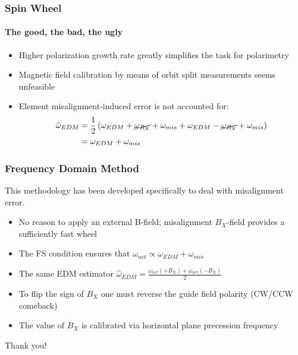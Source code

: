 \documentclass{beamer}
\newcommand{\w}{\omega}
\begin{document}
\begin{frame}\frametitle{Spin Wheel}\framesubtitle{The good, the bad, the ugly}
  \begin{itemize}
  \item Higher polarization growth rate greatly simplifies the task for polarimetry
  \item Magnetic field calibration by means of orbit split measurements seems unfeasible
  \item Element misalignment-induced error is not accounted for:
    \begin{align*}
      \hat\w_{EDM} &= \frac12\left(\w_{EDM} + \cancel{\w_{B_X}} + \w_{mis} + \w_{EDM} - \cancel{\w_{B_X}} + \w_{mis} \right) \\
      &= \w_{EDM} + \w_{mis}
    \end{align*}
  \end{itemize}
\end{frame}

\begin{frame}\frametitle{Frequency Domain Method}
  \begin{block}{}
    This methodology has been developed specifically to deal with
    misalignment error.
  \end{block}
  \begin{itemize}
  \item No reason to apply an external B-field; misalignment $B_X$-field provides a sufficiently fast wheel
  \item The FS condition ensures that $\w_{net} \propto \w_{EDM} + \w_{mis}$
  \item The same EDM estimator $\hat\w_{EDM} = \frac{\w_{net}(+B_X) + \w_{net}(-B_X)}{2}$
  \item To flip the sign of $B_X$ one must reverse the guide field polarity (CW/CCW comeback)
  \item The value of $B_X$ is calibrated via horizontal plane precession frequency
  \end{itemize}
\end{frame}

\begin{frame}
  \begin{center}
    Thank you!
  \end{center}
\end{frame}
\end{document}
